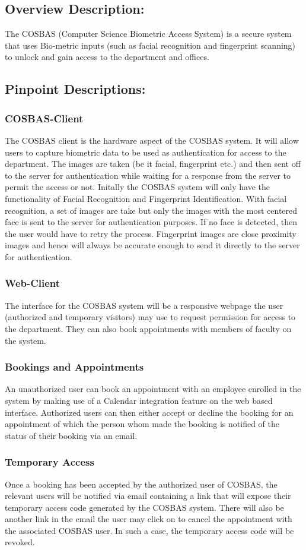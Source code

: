 \subsection{Overview Description:}
	The COSBAS (Computer Science Biometric Access System) is a secure system that uses Bio-metric inputs (such as facial recognition and fingerprint scanning) to unlock and gain access to the department and offices.
	
\subsection{Pinpoint Descriptions:}
	\subsubsection{COSBAS-Client}
	The COSBAS client is the hardware aspect of the COSBAS system. It will allow users to capture biometric data to be used as authentication for access to the department. The images are taken (be it facial, fingerprint etc.) and then sent off to the server for authentication while waiting for a response from the server to permit the access or not. Initally the COSBAS system will only have the functionality of Facial Recognition and Fingerprint Identification. With facial recognition, a set of images are take but only the images with the most centered face is sent to the server for authentication purposes. If no face is detected, then the user would have to retry the process. Fingerprint images are close proximity images and hence will always be accurate enough to send it directly to the server for authentication.
	
	\subsubsection{Web-Client}
	The interface for the COSBAS system will be a responsive webpage the user (authorized and temporary visitors) may use to request permission for access to the department. They can also book appointments with members of faculty on the system.
	
	\subsubsection{Bookings and Appointments}
	An unauthorized user can book an appointment with an employee enrolled in the system by making use of a Calendar integration feature on the web based interface. Authorized users can then either accept or decline the booking for an appointment of which the person whom made the booking is notified of the status of their booking via an email.
	
	\subsubsection{Temporary Access}
	Once a booking has been accepted by the authorized user of COSBAS, the relevant users will be notified via email containing a link that will expose their temporary access code generated by the COSBAS system. There will also be another link in the email the user may click on to cancel the appointment with the associated COSBAS user. In such a case, the temporary access code will be revoked.